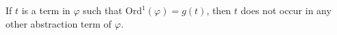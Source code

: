 If $t$ is a term in $\varphi$ such that $\text{Ord}^1(\varphi) = g(t)$, then $t$ does not occur in any other abstraction term of $\varphi$.
